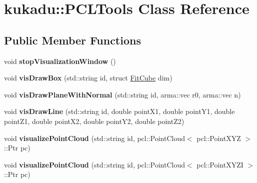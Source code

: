 \hypertarget{classkukadu_1_1PCLTools}{}\section{kukadu\+:\+:P\+C\+L\+Tools Class Reference}
\label{classkukadu_1_1PCLTools}
\subsection*{Public Member Functions}
\begin{DoxyCompactItemize}
\item 
void {\bfseries stop\+Visualization\+Window} ()\hypertarget{classkukadu_1_1PCLTools_a14141dd30ae2c613b6547398bfe7b3d1}{}\label{classkukadu_1_1PCLTools_a14141dd30ae2c613b6547398bfe7b3d1}

\item 
void {\bfseries vis\+Draw\+Box} (std\+::string id, struct \hyperlink{structkukadu_1_1FitCube}{Fit\+Cube} dim)\hypertarget{classkukadu_1_1PCLTools_a77ceff148e148532dfd6edef82aeba70}{}\label{classkukadu_1_1PCLTools_a77ceff148e148532dfd6edef82aeba70}

\item 
void {\bfseries vis\+Draw\+Plane\+With\+Normal} (std\+::string id, arma\+::vec r0, arma\+::vec n)\hypertarget{classkukadu_1_1PCLTools_a561208fa3e7334fb3541d39c18c2008c}{}\label{classkukadu_1_1PCLTools_a561208fa3e7334fb3541d39c18c2008c}

\item 
void {\bfseries vis\+Draw\+Line} (std\+::string id, double point\+X1, double point\+Y1, double point\+Z1, double point\+X2, double point\+Y2, double point\+Z2)\hypertarget{classkukadu_1_1PCLTools_a7f7cfc6e839712f4ca2d8b9e696350f5}{}\label{classkukadu_1_1PCLTools_a7f7cfc6e839712f4ca2d8b9e696350f5}

\item 
void {\bfseries visualize\+Point\+Cloud} (std\+::string id, pcl\+::\+Point\+Cloud$<$ pcl\+::\+Point\+X\+YZ $>$\+::Ptr pc)\hypertarget{classkukadu_1_1PCLTools_a4964f97b079a8ec36b540bfb83d52853}{}\label{classkukadu_1_1PCLTools_a4964f97b079a8ec36b540bfb83d52853}

\item 
void {\bfseries visualize\+Point\+Cloud} (std\+::string id, pcl\+::\+Point\+Cloud$<$ pcl\+::\+Point\+X\+Y\+ZI $>$\+::Ptr pc)\hypertarget{classkukadu_1_1PCLTools_aaadc343ad0aa658435832085edbae347}{}\label{classkukadu_1_1PCLTools_aaadc343ad0aa658435832085edbae347}


\end{DoxyCompactItemize}

